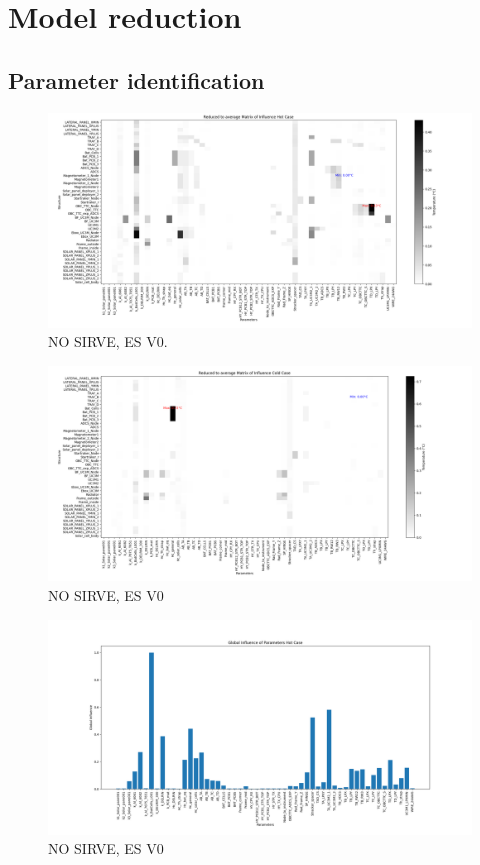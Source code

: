 \section{Model reduction}
\subsection{Parameter identification}
\begin{figure}[H]
	\centering
	\includegraphics[width=\textwidth]{Figures/figs_malas/infmatHot_redAverage.png}
	\caption{NO SIRVE, ES V0.}
	\label{fig:fm1}
\end{figure}
\begin{figure}[H]
	\centering
	\includegraphics[width=\textwidth]{Figures/figs_malas/infmatCold_redAverage.png}
	\caption{NO SIRVE, ES V0}
	\label{fig:fm2}
\end{figure}
\begin{figure}[H]
	\centering
	\includegraphics[width=\textwidth]{Figures/figs_malas/infGlobalHot.png}
	\caption{NO SIRVE, ES V0}
	\label{fig:fm2}
\end{figure}
